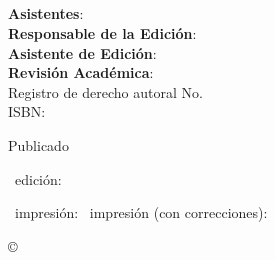 {\begin{spacing}{1.0}
{{        \\[0.6\baselineskip]
    }
    {
    \ifthenelse{\equal{\@subtitulo}{}}
        {\@titulo\\[0.2\baselineskip] \@fasciculo}
        {\@titulo\@sepsubtitulo\ \@subtitulo\\[0.2\baselineskip]\@fasciculo}
        \\[0.6\baselineskip]
    }
    }
    {\@autor}\par
    \small\vspace*{4\baselineskip}
    \ifthenelse{\equal{\@asistente}{}}{}
        {\textbf{Asistentes}: \@asistente \\[1mm]}
    \ifthenelse{\equal{\@editor}{}}{}
        {\textbf{Responsable de la Edici\'on}: \@editor \\[1mm]}
    \ifthenelse{\equal{\@asisedicion}{}}{}
        {\textbf{Asistente de Edici\'on}: \@asisedicion \\[1mm]}
    \ifthenelse{\equal{\@revision}{}}{}
        {\textbf{Revisi\'on Acad\'emica}: \@revision \\[1mm]}
    \vspace*{4\baselineskip}
    Registro de derecho autoral No. \@regautoral\\[1mm]
    ISBN: \@ISBN\par
    \vspace*{4\baselineskip}
    \ifthenelse{\equal{\@publicado}{}}{}
    {Publicado \@publicado\par
    \vspace*{4\baselineskip}}
    \@edicion\ edici\'on: \@fechaedicion\\[1mm]
    \ifthenelse{\equal{\@impresion}{}}{}
    {
    \ifthenelse{\equal{\@correcciones}{}}
        {\@impresion\ impresi\'on: \@fechaimpresion}
        {\@impresion\ impresi\'on (con correcciones): \@fechaimpresion}\par
    }
    \vspace*{4\baselineskip}
\copyright\ \@derechos\ \@fechapub
\ifthenelse{\equal{\@nota}{}}{}
    {\par\vspace*{4\baselineskip}\@nota}
\endgroup
    \end{spacing}
    \restoregeometry
    \cleartooddpage[\thispagestyle{empty}]
}

\makeatother




\iffalse



